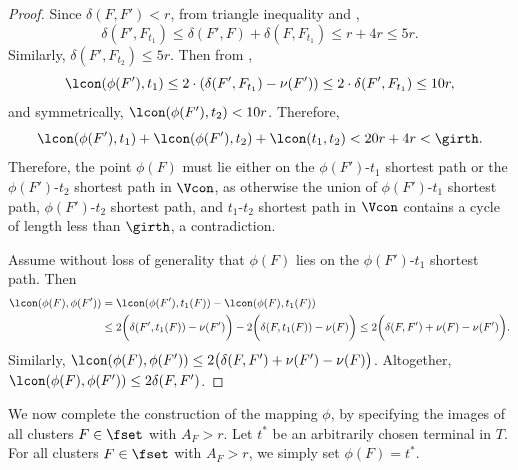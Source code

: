\begin{proof}
Since $\delta(F,F') < r$, from triangle inequality and , 
$$\delta(F',F_{t_1})\le \delta(F',F)+\delta(F,F_{t_1})\le r+4r\le 5r.$$ 
Similarly, $\delta(F',F_{t_2})\le 5r$. 
Then from , 
$$\lcon(\phi(F'),t_1) \le 2\cdot (\delta(F',F_{t_1}) - \nu(F')) \le 2\cdot \delta(F',F_{t_1}) \le  10r,$$ 
and symmetrically, $\lcon(\phi(F'),t_2) < 10r$. Therefore, $$\lcon(\phi(F'),t_1)+\lcon(\phi(F'),t_2)+\lcon(t_1,t_2) < 20r + 4r < \girth.$$
Therefore, the point $\phi(F)$ must lie either on the $\phi(F')$-$t_1$ shortest path or the $\phi(F')$-$t_2$ shortest path in $\Vcon$, as otherwise the union of $\phi(F')$-${t_1}$ shortest path, $\phi(F')$-${t_2}$ shortest path, and $t_1$-${t_2}$ shortest path in $\Vcon$ contains a cycle of length less than $\girth$, a contradiction. 

Assume without loss of generality that $\phi(F)$ lies on the $\phi(F')$-$t_1$ shortest path. Then
\[
\begin{split}
\lcon(\phi(F),\phi(F')) & =\lcon(\phi(F'),t_1(F))-\lcon(\phi(F),t_1(F))\\ 
& \le 2\bigg(\delta(F',t_1(F))-\nu(F')\bigg) - 2\bigg(\delta(F,t_1(F))-\nu(F)\bigg) \le 2\bigg(\delta(F,F')+\nu(F)-\nu(F')\bigg).
\end{split}
\]  
Similarly, $\lcon(\phi(F),\phi(F')) \le 2\big(\delta(F,F')+\nu(F')-\nu(F)\big)$. Altogether, $\lcon(\phi(F),\phi(F')) \le 2\delta(F,F')$.
\end{proof}


We now complete the construction of the mapping $\phi$, by specifying the images of all clusters $F\in \fset$ with $A_F> r$. Let $t^*$ be an arbitrarily chosen terminal in $T$. For all clusters $F\in \fset$ with $A_F > r$, we simply set $\phi(F) = t^*$. 


